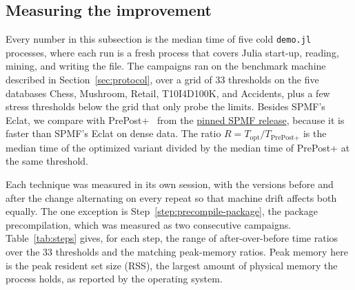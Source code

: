 \subsection{Measuring the improvement}
\label{sec:measure}
Every number in this subsection is the median time of five cold \texttt{demo.jl}
processes, where each run is a fresh process that covers Julia start-up, reading, mining,
and writing the file. The campaigns ran on the benchmark machine described in
Section~\ref{sec:protocol}, over a grid of 33 thresholds on the five databases Chess,
Mushroom, Retail, T10I4D100K, and Accidents, plus a few stress thresholds below the grid
that only probe the limits. Besides SPMF's Eclat, we compare with
PrePost+~\cite{deng2015} from the
\href{https://github.com/NgTHung/Itemset/blob/main/tools/spmf/release.toml}{pinned SPMF release},
because it is faster than SPMF's Eclat on dense data. The ratio
$R = T_\text{opt} / T_\text{PrePost+}$ is the median time of the optimized variant
divided by the median time of PrePost+ at the same threshold.

Each technique was measured in its own session, with the versions before and after the
change alternating on every repeat so that machine drift affects both equally. The one
exception is Step~\ref{step:precompile-package}, the package precompilation, which was
measured as two consecutive campaigns. Table~\ref{tab:steps} gives, for each step, the
range of after-over-before time ratios over the 33 thresholds and the matching
peak-memory ratios. Peak memory here is the peak resident set size (RSS), the largest
amount of physical memory the process holds, as reported by the operating system.

